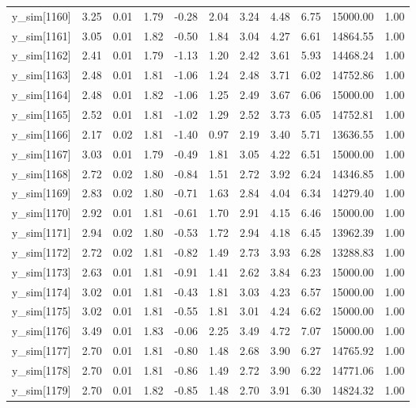\begin{table}[ht]
\begin{tabular}{rrrrrrrrrrr}
  y\_sim[1160] & 3.25 & 0.01 & 1.79 & -0.28 & 2.04 & 3.24 & 4.48 & 6.75 & 15000.00 & 1.00 \\ 
  y\_sim[1161] & 3.05 & 0.01 & 1.82 & -0.50 & 1.84 & 3.04 & 4.27 & 6.61 & 14864.55 & 1.00 \\ 
  y\_sim[1162] & 2.41 & 0.01 & 1.79 & -1.13 & 1.20 & 2.42 & 3.61 & 5.93 & 14468.24 & 1.00 \\ 
  y\_sim[1163] & 2.48 & 0.01 & 1.81 & -1.06 & 1.24 & 2.48 & 3.71 & 6.02 & 14752.86 & 1.00 \\ 
  y\_sim[1164] & 2.48 & 0.01 & 1.82 & -1.06 & 1.25 & 2.49 & 3.67 & 6.06 & 15000.00 & 1.00 \\ 
  y\_sim[1165] & 2.52 & 0.01 & 1.81 & -1.02 & 1.29 & 2.52 & 3.73 & 6.05 & 14752.81 & 1.00 \\ 
  y\_sim[1166] & 2.17 & 0.02 & 1.81 & -1.40 & 0.97 & 2.19 & 3.40 & 5.71 & 13636.55 & 1.00 \\ 
  y\_sim[1167] & 3.03 & 0.01 & 1.79 & -0.49 & 1.81 & 3.05 & 4.22 & 6.51 & 15000.00 & 1.00 \\ 
  y\_sim[1168] & 2.72 & 0.02 & 1.80 & -0.84 & 1.51 & 2.72 & 3.92 & 6.24 & 14346.85 & 1.00 \\ 
  y\_sim[1169] & 2.83 & 0.02 & 1.80 & -0.71 & 1.63 & 2.84 & 4.04 & 6.34 & 14279.40 & 1.00 \\ 
  y\_sim[1170] & 2.92 & 0.01 & 1.81 & -0.61 & 1.70 & 2.91 & 4.15 & 6.46 & 15000.00 & 1.00 \\ 
  y\_sim[1171] & 2.94 & 0.02 & 1.80 & -0.53 & 1.72 & 2.94 & 4.18 & 6.45 & 13962.39 & 1.00 \\ 
  y\_sim[1172] & 2.72 & 0.02 & 1.81 & -0.82 & 1.49 & 2.73 & 3.93 & 6.28 & 13288.83 & 1.00 \\ 
  y\_sim[1173] & 2.63 & 0.01 & 1.81 & -0.91 & 1.41 & 2.62 & 3.84 & 6.23 & 15000.00 & 1.00 \\ 
  y\_sim[1174] & 3.02 & 0.01 & 1.81 & -0.43 & 1.81 & 3.03 & 4.23 & 6.57 & 15000.00 & 1.00 \\ 
  y\_sim[1175] & 3.02 & 0.01 & 1.81 & -0.55 & 1.81 & 3.01 & 4.24 & 6.62 & 15000.00 & 1.00 \\ 
  y\_sim[1176] & 3.49 & 0.01 & 1.83 & -0.06 & 2.25 & 3.49 & 4.72 & 7.07 & 15000.00 & 1.00 \\ 
  y\_sim[1177] & 2.70 & 0.01 & 1.81 & -0.80 & 1.48 & 2.68 & 3.90 & 6.27 & 14765.92 & 1.00 \\ 
  y\_sim[1178] & 2.70 & 0.01 & 1.81 & -0.86 & 1.49 & 2.72 & 3.90 & 6.22 & 14771.06 & 1.00 \\ 
  y\_sim[1179] & 2.70 & 0.01 & 1.82 & -0.85 & 1.48 & 2.70 & 3.91 & 6.30 & 14824.32 & 1.00 \\ 

\end{tabular}
\end{table}
